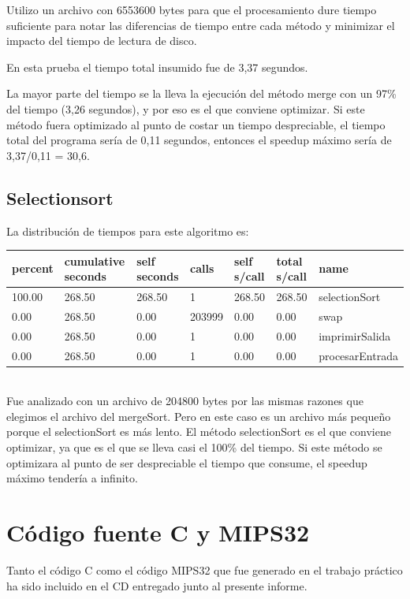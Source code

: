 \documentclass[a4paper,10pt]{article}
\begin{document}
Utilizo un archivo con 6553600 bytes para que el procesamiento dure tiempo suficiente para notar las diferencias de tiempo entre cada m\'etodo y minimizar el impacto del tiempo de lectura de disco.

En esta prueba el tiempo total insumido fue de 3,37 segundos.

La mayor parte del tiempo se la lleva la ejecuci\'on del m\'etodo merge con un 97\% del tiempo (3,26 segundos), y por eso es el que conviene optimizar. Si este m\'etodo fuera optimizado al punto de costar un tiempo despreciable, el tiempo total del programa ser\'ia de 0,11 segundos, entonces el speedup máximo ser\'ia de 3,37/0,11 = 30,6.\\

\subsection{Selectionsort}
La distribuci\'on de tiempos para este algoritmo es:

\begin{tabular}{|l|l|l|l|l|l|l|}
\hline
percent & cumulative seconds & self seconds & calls & self s/call & total s/call & name \\ \hline
100.00  &  268.50  & 268.50  &      1  & 268.50  & 268.50 & selectionSort \\
  0.00  &  268.50  &   0.00  & 203999  &   0.00  &   0.00 & swap \\
  0.00  &  268.50  &   0.00  &      1  &   0.00  &   0.00 & imprimirSalida \\
  0.00  &  268.50  &   0.00  &      1  &   0.00  &   0.00 & procesarEntrada \\
\hline
\end{tabular}\\

Fue analizado con un archivo de 204800 bytes por las mismas razones que elegimos el archivo del mergeSort. Pero en este caso es un archivo m\'as peque\~no porque el selectionSort es m\'as lento. El m\'etodo selectionSort es el que conviene optimizar, ya que es el que se lleva casi el 100\% del tiempo. Si este m\'etodo se optimizara al punto de ser despreciable el tiempo que consume, el speedup m\'aximo tender\'ia a infinito.
\pagebreak

\section{C\'odigo fuente C y MIPS32} 
Tanto el c\'odigo C como el c\'odigo MIPS32 que fue generado en el trabajo pr\'actico ha sido incluido en el CD entregado junto al presente informe.
\pagebreak
\end{document}
